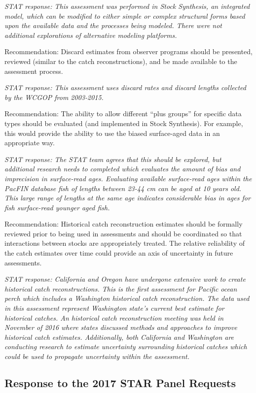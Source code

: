 \documentclass[12pt,]{article}
\begin{document}
\emph{STAT response: This assessment was performed in Stock Synthesis,
an integrated model, which can be modified to either simple or complex
structural forms based upon the available data and the processes being
modeled. There were not additional explorations of alternative modeling
platforms.}

Recommendation: Discard estimates from observer programs should be
presented, reviewed (similar to the catch reconstructions), and be made
available to the assessment process.

\emph{STAT response: This assessment uses discard rates and discard
lengths collected by the WCGOP from 2003-2015.}

Recommendation: The ability to allow different ``plus groups'' for
specific data types should be evaluated (and implemented in Stock
Synthesis). For example, this would provide the ability to use the
biased surface-aged data in an appropriate way.

\emph{STAT response: The STAT team agrees that this should be explored,
but additional research needs to completed which evaluates the amount of
bias and imprecision in surface-read ages. Evaluating available
surface-read ages within the PacFIN database fish of lengths between
23-44 cm can be aged at 10 years old. This large range of lengths at the
same age indicates considerable bias in ages for fish surface-read
younger aged fish.}

Recommendation: Historical catch reconstruction estimates should be
formally reviewed prior to being used in assessments and should be
coordinated so that interactions between stocks are appropriately
treated. The relative reliability of the catch estimates over time could
provide an axis of uncertainty in future assessments.

\emph{STAT response: California and Oregon have undergone extensive work
to create historical catch reconstructions. This is the first assessment
for Pacific ocean perch which includes a Washington historical catch
reconstruction. The data used in this assessment represent Washington
state's current best estimate for historical catches. An historical
catch reconstruction meeting was held in November of 2016 where states
discussed methods and approaches to improve historical catch estimates.
Additionally, both California and Washington are conducting research to
estimate uncertainty surrounding historical catches which could be used
to propagate uncertainty within the assessment.}

\subsection{Response to the 2017 STAR Panel
Requests}\label{response-to-the-2017-star-panel-requests}
\end{document}
